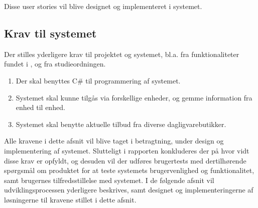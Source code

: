 Disse user stories vil blive designet og implementeret i systemet.

\subsection{Krav til systemet}

Der stilles yderligere krav til projektet og systemet, bl.a. fra funktionaliteter fundet i , og fra studieordningen.
\begin{enumerate}
\item Der skal benyttes C\# til programmering af systemet.
\item Systemet skal kunne tilgås via forskellige enheder, og gemme information fra enhed til enhed.
\item Systemet skal benytte aktuelle tilbud fra diverse dagligvarebutikker.
\end{enumerate}

Alle kravene i dette afsnit vil blive taget i betragtning, under design og implementering af systemet.
Slutteligt i rapporten konkluderes der på hvor vidt disse krav er opfyldt, og desuden vil der udføres brugertests med dertilhørende spørgsmål om produktet for at teste systemets brugervenlighed og funktionalitet, samt brugernes tilfredsstillelse med systemet.
I de følgende afsnit vil udviklingsprocessen yderligere beskrives, samt designet og implementeringerne af løsningerne til kravene stillet i dette afsnit.
